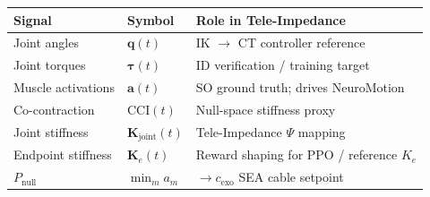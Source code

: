 \documentclass[11pt,a4paper]{article}
\newcommand{\btau}{\bm{\tau}}
\newcommand{\bK}{\bm{K}}
\begin{document}
\begin{tabular}{lll}
\toprule
\textbf{Signal} & \textbf{Symbol} & \textbf{Role in Tele-Impedance} \\
\midrule
\rowcolor{LightBlue}  Joint angles     & $\bm{q}(t)$          & IK $\to$ CT controller reference \\
Joint torques    & $\btau(t)$           & ID verification / training target \\
\rowcolor{LightBlue}  Muscle activations & $\bm{a}(t)$        & SO ground truth; drives NeuroMotion \\
Co-contraction   & $\text{CCI}(t)$      & Null-space stiffness proxy \\
\rowcolor{LightBlue}  Joint stiffness  & $\bK_\text{joint}(t)$ & Tele-Impedance $\Psi$ mapping \\
Endpoint stiffness & $\bm{K}_e(t)$     & Reward shaping for PPO / reference $K_e$ \\
\rowcolor{LightBlue}  $P_\text{null}$  & $\min_m a_m$         & $\to c_\text{exo}$ SEA cable setpoint \\
\bottomrule
\end{tabular}
\end{document}
